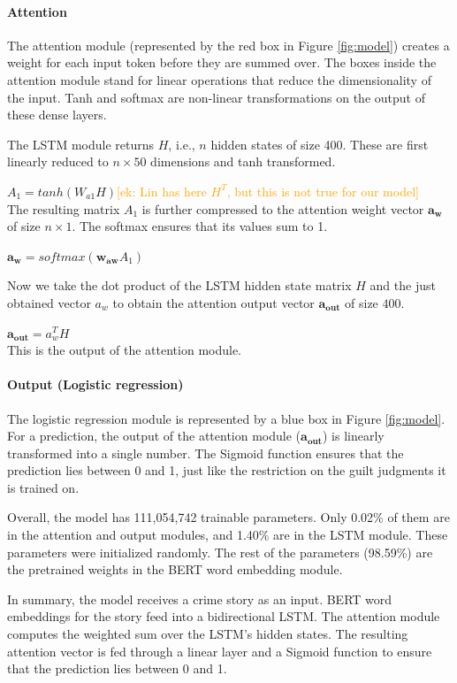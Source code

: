 \documentclass[11pt,a4paper]{article}
\newcommand{\ek}[1]{\textcolor{Orange}{[ek: #1]}}
\begin{document}
\paragraph{Attention}
The attention module (represented by the red box in Figure \ref{fig:model}) creates a weight for each input token before they are summed over. The boxes inside the attention module stand for linear operations that reduce the dimensionality of the input. Tanh and softmax are non-linear transformations on the output of these dense layers.

The LSTM module returns $H$, i.e., $n$ hidden states of size 400. These are first linearly reduced to $n \times 50$ dimensions and tanh transformed. 

$A_1 = tanh(W_{a1} H)$\ek{Lin has here $H^T$, but this is not true for our model}\\
The resulting matrix $A_1$ is further compressed to the attention weight vector $\mathbf{a_w}$ of size $n \times 1$. The softmax ensures that its values sum to 1.

$\mathbf{a_w} = softmax(\mathbf{w_{aw}} A_1)$

Now we take the dot product of the LSTM hidden state matrix $H$ and the just obtained vector $a_w$ to obtain the attention output vector $\mathbf{a_{out}}$ of size $400$. 

$\mathbf{a_{out}} = a_w^T H$\\
This is the output of the attention module.

\paragraph{Output (Logistic regression)}
The logistic regression module is represented by a blue box in Figure \ref{fig:model}.
For a prediction, the output of the attention module ($\mathbf{a_{out}}$) is linearly transformed into a single number. 
The Sigmoid function ensures that the prediction lies between 0 and 1, just like the restriction on the guilt judgments it is trained on. 


Overall, the model has 111,054,742 trainable parameters. Only 0.02\% of them are in the attention and output modules, and 1.40\% are in the LSTM module. These parameters were initialized randomly. The rest of the parameters (98.59\%) are the pretrained weights in the BERT word embedding module.

In summary, the model receives a crime story as an input. BERT word embeddings for the story feed into a bidirectional LSTM. The attention module computes the weighted sum over the LSTM's hidden states. The resulting attention vector is fed through a linear layer and a Sigmoid function to ensure that the prediction lies between 0 and 1.
\end{document}
